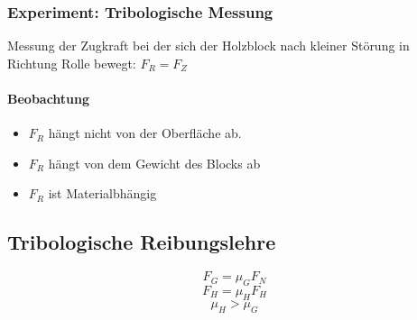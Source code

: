 \documentclass[a4paper]{scrartcl}
\theoremstyle{definition}
\theoremstyle{plain}
\theoremstyle{plain}
\theoremstyle{remark}
\theoremstyle{remark}
\theoremstyle{remark}
\begin{document}

\subsubsection{Experiment: Tribologische Messung}
\label{sec-3-7-2}
Messung der Zugkraft bei der sich der Holzblock nach kleiner Störung in Richtung Rolle bewegt: $F_R = F_Z$
\paragraph{Beobachtung}
\label{sec-3-7-2-1}
\begin{itemize}
\item $F_R$ hängt nicht von der Oberfläche ab.
\item $F_R$ hängt von dem Gewicht des Blocks ab
\item $F_R$ ist Materialbhängig
\end{itemize}

\subsection{Tribologische Reibungslehre}
\label{sec-3-8}
\[F_G = \mu_G F_N \tag{$\mu_G=$ Gleitreibungskraft}\]
\[F_H = \mu_H F_H \tag{$\mu_H=$ Haftreibungskraft}\]
\[\mu_H > \mu_G\]
\end{document}
